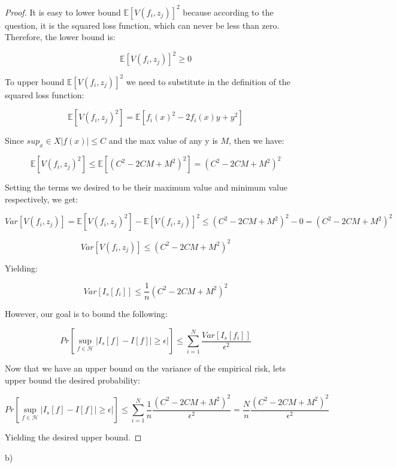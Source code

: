 \documentclass[12pt]{report}
\begin{document}
\begin{proof}
It is easy to lower bound $\mathbb{E}[V(f_i,z_j)]^2$ because according to the question, it is the squared loss function, which can never be less than zero. Therefore, the lower bound is:

$$\mathbb{E}[V(f_i,z_j)]^2 \geq 0$$

To upper bound  $\mathbb{E}[V(f_i,z_j)]^2$ we need to substitute in the definition of the squared loss function:

$$\mathbb{E}[V(f_i,z_j)^2] = \mathbb{E}[f_i(x)^2 - 2f_i(x)y + y^2] $$

Since $sup_x \in X |f(x)| \leq C$ and the max value of any y is $M$, then we have:


$$\mathbb{E}[V(f_i,z_j)^2] \leq \mathbb{E}[(C^2 - 2CM + M^2)^2] = (C^2 - 2CM + M^2)^2 $$

Setting the terms we desired to be their maximum value and minimum value respectively, we get:

$$Var[V(f_i,z_j)] = \mathbb{E}[V(f_i,z_j)^2] - \mathbb{E}[V(f_i,z_j)]^2 \leq (C^2 - 2CM + M^2)^2 - 0 = (C^2 - 2CM + M^2)^2 $$

$$Var[V(f_i,z_j)] \leq (C^2 - 2CM + M^2)^2$$

Yielding: 

$$Var[I_s[f_i]] \leq \frac{1}{n} (C^2 - 2CM + M^2)^2$$

However, our goal is to bound the following:

$$Pr[ \sup\limits_{f \in \mathcal{H}}  | I_s[f] - I[f] | \geq \epsilon|] \leq \sum^{N}_{i=1} \frac{ Var[I_s[f_i]] }{ \epsilon^2 }$$

Now that we have an upper bound on the variance of the empirical risk, lets upper bound the desired probability:

$$Pr[ \sup\limits_{f \in \mathcal{H}}  | I_s[f] - I[f] | \geq \epsilon|] \leq \sum^{N}_{i=1} \frac{1}{n} \frac{ (C^2 - 2CM + M^2)^2 }{ \epsilon^2 } = \frac{N}{n} \frac{ (C^2 - 2CM + M^2)^2 }{ \epsilon^2 }$$

Yielding the desired upper bound.
\end{proof}

b)

\end{document}
